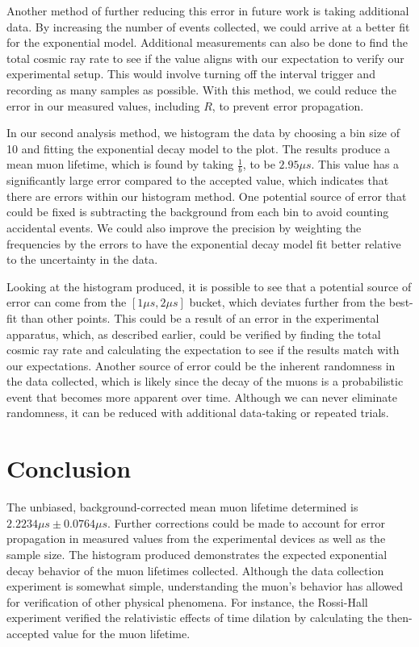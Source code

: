 \documentclass[
 reprint,
 twocolumn,
 amsmath,amssymb,
 aps,
 pra,
 floatfix,
]{revtex4-1}
\begin{document}
Another method of further reducing this error in future work
is taking additional data. By increasing the number of events collected, we
could arrive at a better fit for the exponential model.
Additional measurements can also be done to find the total cosmic ray rate to
see if the value aligns with our expectation to verify our experimental setup.
This would involve turning off the interval trigger and recording as many
samples as possible. With this method, we could reduce the error in our measured
values, including $R$, to prevent error propagation.

In our second analysis method, we histogram the data by choosing a bin size of
10 and fitting the exponential decay model to the plot. The results produce a
mean muon lifetime, which is found by taking $\frac{1}{b}$, to be $2.95 \mu s$.
This value has a significantly large error compared to the accepted value, which
indicates that there are errors within our histogram method. One potential
source of error that could be fixed is subtracting the background from each bin
to avoid counting accidental events. We could also improve the precision by
weighting the frequencies by the errors to have the exponential decay model
fit better relative to the uncertainty in the data.

Looking at the histogram produced, it is possible to see that a potential source
of error can come from the $[1 \mu s, 2 \mu s]$ bucket, which deviates further
from the best-fit than other points. This could be a result of an error in the
experimental apparatus, which, as described earlier, could be verified by
finding the total cosmic ray rate and calculating the expectation to see if
the results match with our expectations. Another source of error could be the
inherent randomness in the data collected, which is likely since the decay of
the muons is a probabilistic event that becomes more apparent over time.
Although we can never eliminate randomness, it can be reduced with additional
data-taking or repeated trials.

\section{Conclusion}

The unbiased, background-corrected mean muon lifetime determined is
$2.2234 \mu s \pm 0.0764 \mu s$. Further corrections could be made to account
for error propagation in measured values from the experimental devices as well
as the sample size. The histogram produced demonstrates the expected
exponential decay behavior of the muon lifetimes collected. Although the data
collection experiment is somewhat simple, understanding the muon's behavior
has allowed for verification of other physical phenomena. For instance, the
Rossi-Hall experiment verified the relativistic effects of time dilation by
calculating the then-accepted value for the muon lifetime. \cite{PhysRev.59.223}
\end{document}
